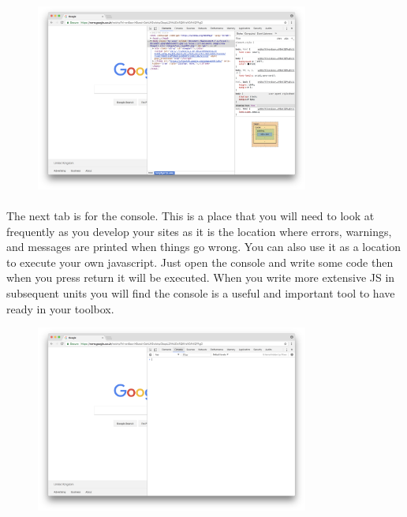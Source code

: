 \documentclass[12pt, a4paper, oneside]{book}
\begin{document}
\begin{figure}[H]
\centering
\includegraphics[width=0.8\textwidth]{figures/devtools_elements.png}
\label{fig:devtools_elements}
\end{figure}

\paragraph{} The next tab is for the console. This is a place that you will need to look at frequently as you develop your sites as it is the location where errors, warnings, and messages are printed when things go wrong.  You can also use it as a location to execute your own javascript. Just open the console and write some code then when you press return it will be executed. When you write more extensive JS in subsequent units you will find the console is a useful and important tool to have ready in your toolbox.


\begin{figure}[H]
\centering
\includegraphics[width=0.8\textwidth]{figures/devtools_console.png}
\label{fig:devtools_console}
\end{figure}
\end{document}
